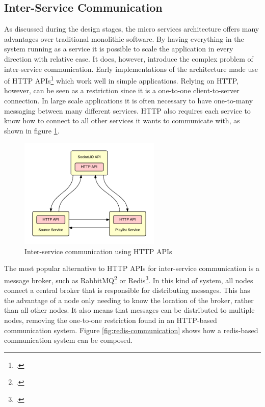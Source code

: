 \clearpage
\subsection{Inter-Service Communication}

As discussed during the design stages, the micro services architecture offers many advantages over traditional monolithic software. By having everything in the system running as a service it is possible to scale the application in every direction with relative ease. It does, however, introduce the complex problem of inter-service communication. Early implementations of the architecture made use of HTTP APIs\footcite{microservices-mueller} which work well in simple applications. Relying on HTTP, however, can be seen as a restriction since it is a one-to-one client-to-server connection. In large scale applications it is often necessary to have one-to-many messaging between many different services. HTTP also requires each service to know how to connect to all other services it wants to communicate with, as shown in figure \ref{fig:http-communication}.

\begin{figure}[h!]
  \centering
  \includegraphics[width=0.6\textwidth]{./img/http.png}
  \caption{Inter-service communication using HTTP APIs}
  \label{fig:http-communication}
\end{figure}

The most popular alternative to HTTP APIs for inter-service communication is a message broker, such as RabbitMQ\footcite{rabbitmq} or Redis\footcite{redis}. In this kind of system, all nodes connect a central broker that is responsible for distributing messages. This has the advantage of a node only needing to know the location of the broker, rather than all other nodes. It also means that messages can be distributed to multiple nodes, removing the one-to-one restriction found in an HTTP-based communication system. Figure \ref{fig:redis-communication} shows how a redis-based communication system can be composed.

